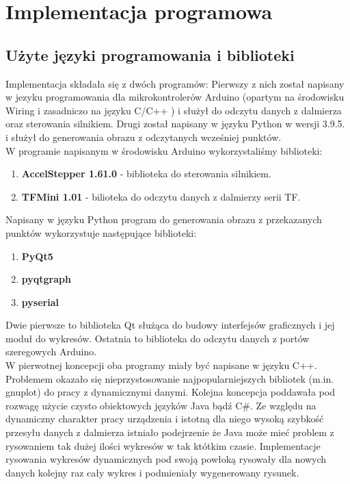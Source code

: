 \section {Implementacja programowa}

\subsection {Użyte języki programowania i biblioteki}
Implementacja składała się z dwóch programów: Pierwszy z nich został napisany w jezyku programowania dla mikrokontrolerów Arduino (opartym na środowisku Wiring i zasadniczo na języku C/C++ \cite{arduino}) i służył do odczytu danych z dalmierza oraz sterowania silnikiem. Drugi został napisany w języku Python w wersji 3.9.5. i służył do generowania obrazu z odczytanych wcześniej punktów.\\

W programie napisanym w środowisku Arduino wykorzystaliśmy biblioteki:

\begin{enumerate}
    \item \textbf{AccelStepper 1.61.0} - biblioteka do sterowania silnikiem.
    \item \textbf{TFMini 1.01} - bilioteka do odczytu danych z dalmierzy serii TF.
\end{enumerate}

Napisany w języku Python program do generowania obrazu z przekazanych punktów wykorzystuje następujące biblioteki:

\begin{enumerate}
    \item \textbf{PyQt5}
    \item \textbf{pyqtgraph}
    \item \textbf{pyserial}
\end{enumerate}

Dwie pierwsze to biblioteka Qt służąca do budowy interfejsów graficznych i jej moduł do wykresów. Ostatnia to biblioteka do odczytu danych z portów szeregowych Arduino.\\

W pierwotnej koncepcji oba programy miały być napisane w języku C++. Problemem okazało się nieprzystosowanie najpopularniejszych bibliotek (m.in. gnuplot) do pracy z dynamicznymi danymi. Kolejna koncepcja poddawała pod rozwagę użycie czysto obiektowych języków Java bądź C\#. Ze względu na dynamiczny charakter pracy urządzenia i istotną dla niego wysoką szybkość przesyłu danych z dalmierza istniało podejrzenie że Java może mieć problem z rysowaniem tak dużej ilości wykresów w tak któtkim czasie. Implementacje rysowania wykresów dynamicznych pod swoją powłoką rysowały dla nowych danych kolejny raz cały wykres i podmieniały wygenerowany rysunek.\\

